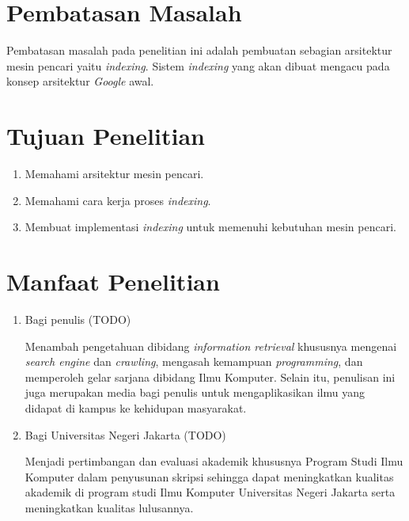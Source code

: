 \section{Pembatasan Masalah}
Pembatasan masalah pada penelitian ini adalah pembuatan sebagian arsitektur
mesin pencari yaitu \emph{indexing}. Sistem \emph{indexing} yang akan dibuat
mengacu pada konsep arsitektur \emph{Google} awal.

\section{Tujuan Penelitian}
\begin{enumerate}
	\item Memahami arsitektur mesin pencari.
	\item Memahami cara kerja proses \emph{indexing}.
	\item Membuat implementasi \emph{indexing} untuk memenuhi kebutuhan mesin
		pencari.
\end{enumerate}

\section{Manfaat Penelitian}
\begin{enumerate}
	\item Bagi penulis (TODO)
		
	Menambah pengetahuan dibidang \emph{information retrieval} khususnya mengenai
		\emph{search engine} dan \emph{crawling}, mengasah kemampuan
		\emph{programming}, dan memperoleh gelar sarjana dibidang Ilmu Komputer.
		Selain itu, penulisan ini juga merupakan media bagi penulis untuk
		mengaplikasikan ilmu yang didapat di kampus ke kehidupan masyarakat.
		
	\item Bagi Universitas Negeri Jakarta (TODO)
	
	Menjadi pertimbangan dan evaluasi akademik khususnya Program Studi Ilmu
		Komputer dalam penyusunan skripsi sehingga dapat meningkatkan kualitas
		akademik di program studi Ilmu Komputer Universitas Negeri Jakarta serta
		meningkatkan kualitas lulusannya.
			
\end{enumerate}

\begin{comment}

\end{comment}
